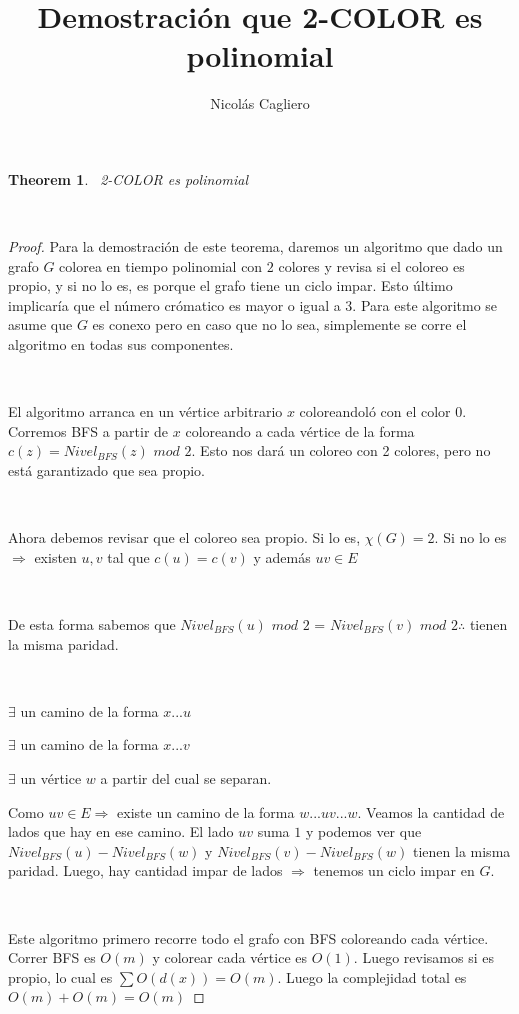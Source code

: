 \documentclass[11pt]{article}
\title{Demostración que 2-COLOR es polinomial}
\author{Nicolás Cagliero}
\newtheorem{theorem}{Theorem}
\begin{document}
\maketitle
\begin{theorem}\par
\
2-COLOR es polinomial\par
\

\end{theorem}

\begin{proof}
Para la demostración de este teorema, daremos un algoritmo que dado un grafo $G$ colorea en tiempo polinomial con $2$ colores y revisa si el coloreo es propio, y si no lo es, es porque el grafo tiene un ciclo impar. Esto último implicaría que el número crómatico es mayor o igual a $3$. Para este algoritmo se asume que $G$ es conexo pero en caso que no lo sea, simplemente se corre el algoritmo en todas sus componentes.\par
\

El algoritmo arranca en un vértice arbitrario $x$ coloreandoló con el color $0$. Corremos BFS a partir de $x$ coloreando a cada vértice de la forma $c(z) = Nivel_{BFS}(z)$ $mod$ $2$. Esto nos dará un coloreo con 2 colores, pero no está garantizado que sea propio.\par
\

Ahora debemos revisar que el coloreo sea propio. Si lo es, $\chi(G) = 2$. Si no lo es $\Rightarrow$ existen $u, v$ tal que $c(u) = c(v)$ y además $uv \in E$\par
\

De esta forma sabemos que $Nivel_{BFS}(u)$ $mod$ $2$ = $Nivel_{BFS}(v)$ $mod$ $2 \therefore$ tienen la misma paridad. \par
\

$\exists$ un camino de la forma $x...u$\par
$\exists$ un camino de la forma $x...v$\par
$\exists$ un vértice $w$ a partir del cual se separan.\par
Como $uv \in E \Rightarrow$ existe un camino de la forma $w...uv...w$. Veamos la cantidad de lados que hay en ese camino. El lado $uv$ suma $1$ y podemos ver que $Nivel_{BFS}(u) - Nivel_{BFS}(w)$ y $Nivel_{BFS}(v) - Nivel_{BFS}(w)$ tienen la misma paridad. Luego, hay cantidad impar de lados $\Rightarrow$ tenemos un ciclo impar en $G$.\par
\

Este algoritmo primero recorre todo el grafo con BFS coloreando cada vértice. Correr BFS es $O(m)$ y colorear cada vértice es $O(1)$. Luego revisamos si es propio, lo cual es $\sum O(d(x)) = O(m)$. Luego la complejidad total es $O(m) +O(m) = O(m)$
\end{proof}
\end{document}
